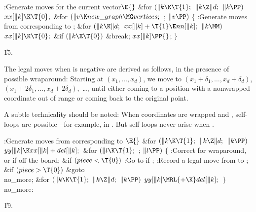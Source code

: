 \Y\B\4:Generate moves for the current  vector\X${}\E{}$\6
\&{for} ${}(\|k\K\T{1};{}$ ${}\|k\Z\|d;{}$ ${}\|k\PP){}$\1\5
${}\\{xx}[\|k]\K\T{0};{}$\2\6
\&{for} ${}(\|v\K\\{new\_graph}\MG\\{vertices};{}$  ; ${}\|v\PP){}$\5
${}\{{}$\1\6
:Generate moves from  corresponding to \X;\6
\&{for} ${}(\|k\K\|d;{}$ ${}\\{xx}[\|k]+\T{1}\E\\{nn}[\|k];{}$ ${}\|k\MM){}$\1\5
${}\\{xx}[\|k]\K\T{0};{}$\2\6
\&{if} ${}(\|k\E\T{0}){}$\1\5
\&{break};\2\6
${}\\{xx}[\|k]\PP{}$;\6
\4${}\}{}$\2\par
\U15.\fi

The legal moves when  is negative are derived as follows,
in
the presence of possible wraparound: Starting at $(x_1,\ldots,x_d)$, we
move to $(x_1+\delta_1,\ldots,x_d+\delta_d)$, $(x_1+2\delta_1,\ldots,
x_d+2\delta_d)$,~\dots, until either coming to a position with a nonwrapped
coordinate out of range or coming back to the original point.

A subtle technicality should be noted: When coordinates are wrapped and
, self-loops are possible---for example, in .
But self-loops never arise when .

\Y\B\4:Generate moves from  corresponding to \X${}\E{}$%
\6
\&{for} ${}(\|k\K\T{1};{}$ ${}\|k\Z\|d;{}$ ${}\|k\PP){}$\1\5
${}\\{yy}[\|k]\K\\{xx}[\|k]+\\{del}[\|k];{}$\2\6
\&{for} ${}(\|l\K\T{1};{}$  ; ${}\|l\PP){}$\5
${}\{{}$\1\6
:Correct for wraparound, or  if off the board\X;\6
\&{if} ${}(\\{piece}<\T{0}){}$\1\5
:Go to  if \X;\2\6
:Record a legal move from  to \X;\6
\&{if} ${}(\\{piece}>\T{0}){}$\1\5
\&{goto} \\{no\_more};\2\6
\&{for} ${}(\|k\K\T{1};{}$ ${}\|k\Z\|d;{}$ ${}\|k\PP){}$\1\5
${}\\{yy}[\|k]\MRL{+{\K}}\\{del}[\|k];{}$\2\6
\4${}\}{}$\2\6
\4\\{no\_more}:\par
\U19.\fi

